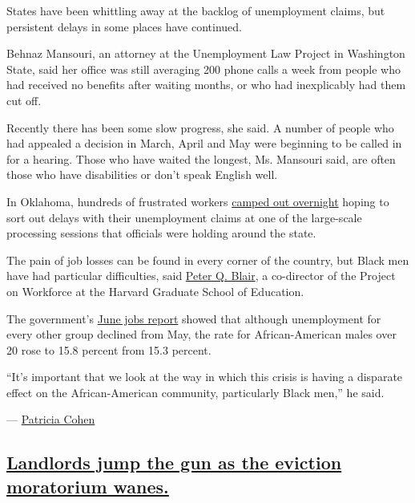 States have been whittling away at the backlog of unemployment claims,
but persistent delays in some places have continued.

Behnaz Mansouri, an attorney at the Unemployment Law Project in
Washington State, said her office was still averaging 200 phone calls a
week from people who had received no benefits after waiting months, or
who had inexplicably had them cut off.

Recently there has been some slow progress, she said. A number of people
who had appealed a decision in March, April and May were beginning to be
called in for a hearing. Those who have waited the longest, Ms. Mansouri
said, are often those who have disabilities or don't speak English well.

In Oklahoma, hundreds of frustrated workers
\href{https://www.washingtonpost.com/national/a-very-dark-feeling-hundreds-camp-out-in-oklahoma-unemployment-lines/2020/07/20/44d59cb6-c77a-11ea-a99f-3bbdffb1af38_story.html}{camped
out overnight} hoping to sort out delays with their unemployment claims
at one of the large-scale processing sessions that officials were
holding around the state.

The pain of job losses can be found in every corner of the country, but
Black men have had particular difficulties, said
\href{https://www.gse.harvard.edu/faculty/peter-blair}{Peter Q. Blair},
a co-director of the Project on Workforce at the Harvard Graduate School
of Education.

The government's
\href{https://www.bls.gov/news.release/empsit.t02.htm}{June jobs report}
showed that although unemployment for every other group declined from
May, the rate for African-American males over 20 rose to 15.8 percent
from 15.3 percent.

``It's important that we look at the way in which this crisis is having
a disparate effect on the African-American community, particularly Black
men,'' he said.

--- \href{https://www.nytimes.com/by/patricia-cohen}{Patricia Cohen}

\hypertarget{landlords-jump-the-gun-as-the-eviction-moratorium-wanes}{%
\subsection{\texorpdfstring{\protect\hyperlink{landlords-jump-the-gun-as-the-eviction-moratorium-wanes}{Landlords
jump the gun as the eviction moratorium
wanes.}}{Landlords jump the gun as the eviction moratorium wanes.}}\label{landlords-jump-the-gun-as-the-eviction-moratorium-wanes}}

